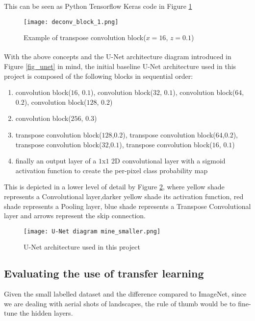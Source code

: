 This can be seen as Python Tensorflow Keras code in Figure \ref{deconv_block_1}
\begin{figure}[hbt!]
    \centering
    \texttt{[image: deconv\_block\_1.png]}
    \caption{Example of transpose convolution block($x=16$, $z=0.1$)}
    \label{deconv_block_1}
\end{figure}
\paragraph{}
With the above concepts and the U-Net architecture diagram introduced in Figure \ref{fig_unet} in mind, the initial baseline U-Net architecture used in this project is composed of the following blocks in sequential order:

    \begin{enumerate}
        \item convolution block($16$, $0.1$), convolution block($32$, $0.1$), convolution block($64$, $0.2$), convolution block($128$, $0.2$)
        \item convolution block($256$, $0.3$)
        \item transpose convolution block($128$,$0.2$), transpose convolution block($64$,$0.2$), transpose convolution block($32$,$ 0.1$), transpose convolution block($16$, $0.1$)
        \item finally an output layer of a $1$x$1$ 2D convolutional layer with a sigmoid activation function to create the per-pixel class probability map
    \end{enumerate}

This is depicted in a lower level of detail by Figure \ref{unet_mine}, where yellow shade represents a Convolutional layer,darker yellow shade its activation function, red shade represents a Pooling layer, blue shade represents a Transpose Convolutional layer and arrows represent the skip connection.

\begin{figure}[hbt!]
    \centering
    \texttt{[image: U-Net diagram mine\_smaller.png]}
    \caption{U-Net architecture used in this project}
    \label{unet_mine}
\end{figure}

\subsection{Evaluating the use of transfer learning}
Given the small labelled dataset and the difference compared to ImageNet, since we are dealing with aerial shots of landscapes, the rule of thumb would be to fine-tune the hidden layers.
